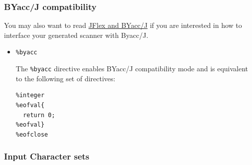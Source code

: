 \subsubsection{BYacc/J compatibility}\label{byaccj-compatibility}

You may also want to read \hyperref[BYaccJ]{JFlex and BYacc/J} if you
are interested in how to interface your generated scanner with Byacc/J.

\begin{itemize}
\item
  \texttt{\%byacc}

  The \texttt{\%byacc} directive enables BYacc/J compatibility mode and
  is equivalent to the following set of directives:

\begin{verbatim}
%integer
%eofval{
  return 0;
%eofval}
%eofclose
\end{verbatim}
\end{itemize}

\subsubsection{Input Character sets}\label{input-character-sets}

